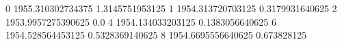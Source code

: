 0 1955.310302734375 1.3145751953125
1 1954.313720703125 0.3179931640625
2 1953.9957275390625 0.0
4 1954.134033203125 0.1383056640625
6 1954.528564453125 0.5328369140625
8 1954.6695556640625 0.673828125
